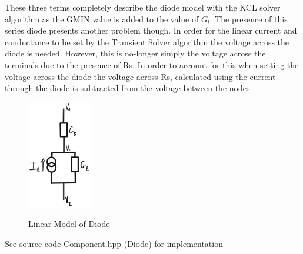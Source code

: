 \documentclass{article}
\begin{document}
These three terms completely describe the diode model with the KCL solver algorithm as the GMIN value is added to the value of $G_l$. The presence of this series diode presents another problem though. In order for the linear current and conductance to be set by the Transient Solver algorithm the voltage across the diode is needed. However, this is no-longer simply the voltage across the terminals due to the presence of Rs. In order to account for this when setting the voltage across the diode the voltage across Rs, calculated using the current through the diode is subtracted from the voltage between the nodes. 
\begin{figure}[h]
    \caption{Linear Model of Diode}
    \centering
    \includegraphics[width=0.25\textwidth]{images/DiodeCircuit.png}
    \label{fig:diode}
\end{figure}
\bigbreak
See source code Component.hpp (Diode) for implementation
\newpage
\end{document}
